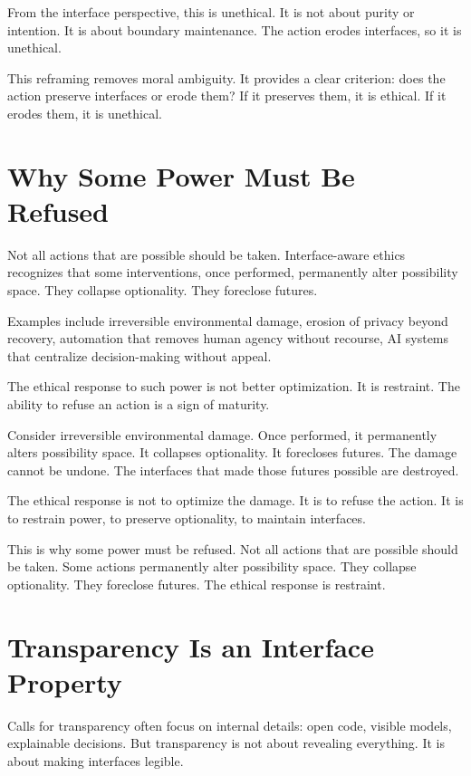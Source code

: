 \documentclass[
  openright]{book}
\begin{document}
From the interface perspective, this is unethical. It is not about
purity or intention. It is about boundary maintenance. The action erodes
interfaces, so it is unethical.

This reframing removes moral ambiguity. It provides a clear criterion:
does the action preserve interfaces or erode them? If it preserves them,
it is ethical. If it erodes them, it is unethical.

\section{Why Some Power Must Be
Refused}\label{why-some-power-must-be-refused}

Not all actions that are possible should be taken. Interface-aware
ethics recognizes that some interventions, once performed, permanently
alter possibility space. They collapse optionality. They foreclose
futures.

Examples include irreversible environmental damage, erosion of privacy
beyond recovery, automation that removes human agency without recourse,
AI systems that centralize decision-making without appeal.

The ethical response to such power is not better optimization. It is
restraint. The ability to refuse an action is a sign of maturity.

Consider irreversible environmental damage. Once performed, it
permanently alters possibility space. It collapses optionality. It
forecloses futures. The damage cannot be undone. The interfaces that
made those futures possible are destroyed.

The ethical response is not to optimize the damage. It is to refuse the
action. It is to restrain power, to preserve optionality, to maintain
interfaces.

This is why some power must be refused. Not all actions that are
possible should be taken. Some actions permanently alter possibility
space. They collapse optionality. They foreclose futures. The ethical
response is restraint.

\section{Transparency Is an Interface
Property}\label{transparency-is-an-interface-property}

Calls for transparency often focus on internal details: open code,
visible models, explainable decisions. But transparency is not about
revealing everything. It is about making interfaces legible.
\end{document}
